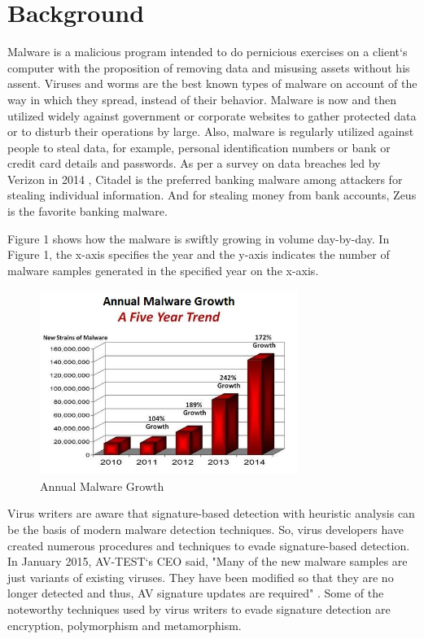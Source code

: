 \chapter{Background}

Malware is a malicious program intended to do pernicious exercises on a client`s computer with the proposition of removing data and misusing assets without his assent. Viruses and worms are the best known types of malware on account of the way in which they spread, instead of their behavior. Malware is now and then utilized widely against government or corporate websites to gather protected data or to disturb their operations by large. Also, malware is regularly utilized against people to steal data, for example, personal identification numbers or bank or credit card details and passwords. As per a survey on data breaches led by Verizon in 2014 \cite{bib9}, Citadel is the preferred banking malware among attackers for stealing individual information. And for stealing money from bank accounts, Zeus is the favorite banking malware.

Figure 1 shows how the malware is swiftly growing in volume day-by-day. In Figure 1, the x-axis specifies the year and the y-axis indicates the number of malware samples generated in the specified year on the x-axis.

\begin{figure}
    \centering    
    \includegraphics[width=8.4cm, height=6cm]{malware-growth-chart.jpg}
    \caption[Annual Malware Growth]{Annual Malware Growth \cite{bib10}}
\end{figure}
Virus writers are aware that signature-based detection with heuristic analysis can be the basis of modern malware detection techniques. So, virus developers have created numerous procedures and techniques to evade signature-based detection. In January 2015, AV-TEST`s CEO said, "Many of the new malware samples are just variants of existing viruses. They have been modified so that they are no longer detected and thus, AV signature updates are required" \cite{bib10}. Some of the noteworthy techniques used by virus writers to evade signature detection are encryption, polymorphism and metamorphism.


